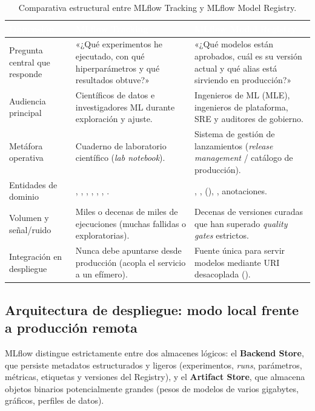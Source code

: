 \begin{table}[htbp]
\centering
\caption{Comparativa estructural entre MLflow Tracking y MLflow Model Registry.}
\label{tab:tracking-vs-registry}
\small
\begin{tabularx}{\textwidth}{@{}L{3.1cm} Y Y@{}}
\toprule
{}
\textcolor{white}{\sffamily\bfseries Dimensión} &
\textcolor{white}{\sffamily\bfseries MLflow Tracking} &
\textcolor{white}{\sffamily\bfseries MLflow Model Registry} \\
\midrule
Pregunta central que responde &
«¿Qué experimentos he ejecutado, con qué hiperparámetros y qué resultados obtuve?» &
«¿Qué modelos están aprobados, cuál es su versión actual y qué alias está sirviendo en producción?» \\
Audiencia principal &
Científicos de datos e investigadores ML durante exploración y ajuste. &
Ingenieros de ML (MLE), ingenieros de plataforma, SRE y auditores de gobierno. \\
Metáfora operativa &
Cuaderno de laboratorio científico (\textit{lab notebook}). &
Sistema de gestión de lanzamientos (\textit{release management} / catálogo de producción). \\
Entidades de dominio &
, , , , , , . &
, ,  (), , anotaciones. \\
Volumen y señal/ruido &
Miles o decenas de miles de ejecuciones (muchas fallidas o exploratorias). &
Decenas de versiones curadas que han superado \textit{quality gates} estrictos. \\
Integración en despliegue &
Nunca debe apuntarse desde producción (acopla el servicio a un  efímero). &
Fuente única para servir modelos mediante URI desacoplada (). \\
\bottomrule
\end{tabularx}
\end{table}

\subsection{Arquitectura de despliegue: modo local frente a producción remota}

MLflow distingue estrictamente entre dos almacenes lógicos: el \textbf{Backend Store}, que persiste metadatos estructurados y ligeros (experimentos, \textit{runs}, parámetros, métricas, etiquetas y versiones del Registry), y el \textbf{Artifact Store}, que almacena objetos binarios potencialmente grandes (pesos de modelos de varios gigabytes, gráficos, perfiles de datos).

